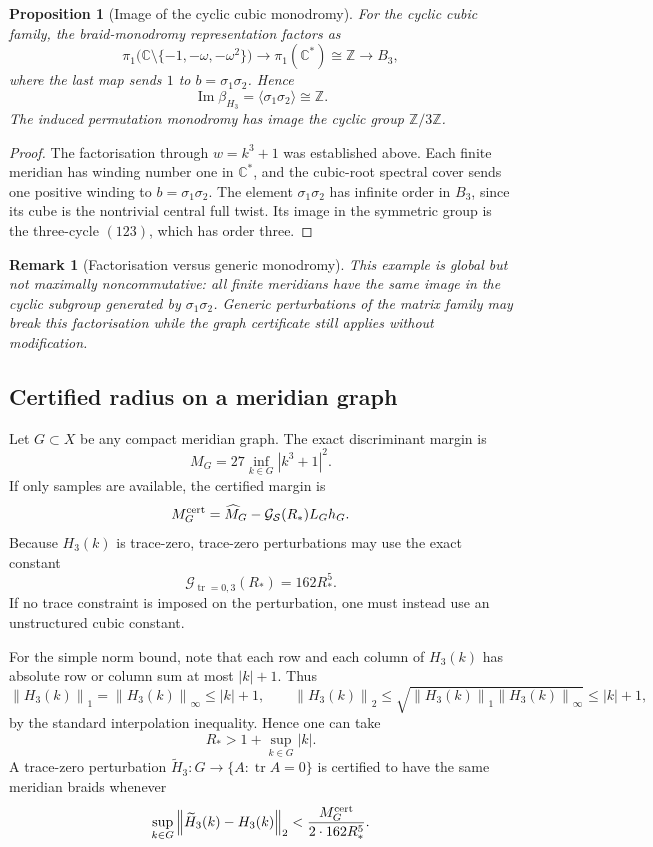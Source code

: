 \documentclass[11pt]{article}
\newtheorem{proposition}[theorem]{Proposition}
\newtheorem{remark}[theorem]{Remark}
\numberwithin{equation}{section}
\DeclareMathOperator{\tr}{tr}
\newcommand{\bbC}{\mathbb C}
\newcommand{\bbZ}{\mathbb Z}
\newcommand{\cG}{\mathcal G}
\newcommand{\cS}{\mathcal S}
\newcommand{\norm}[1]{\left\|#1\right\|}
\newcommand{\abs}[1]{\left|#1\right|}
\newcommand{\wt}[1]{\widetilde{#1}}
\begin{document}
\begin{proposition}[Image of the cyclic cubic monodromy]\label{prop:cyclic-image}
For the cyclic cubic family, the braid-monodromy representation factors as
\[
  \pi_1\bigl(\bbC\setminus\{-1,-\omega,-\omega^2\}\bigr)
  \longrightarrow \pi_1(\bbC^*)\cong\bbZ
  \longrightarrow B_3,
\]
where the last map sends \(1\) to \(b=\sigma_1\sigma_2\).  Hence
\[
  \operatorname{Im}\beta_{H_3}=\langle \sigma_1\sigma_2\rangle\cong\bbZ.
\]
The induced permutation monodromy has image the cyclic group \(\bbZ/3\bbZ\).
\end{proposition}

\begin{proof}
The factorisation through \(w=k^3+1\) was established above.  Each finite
meridian has winding number one in \(\bbC^*\), and the cubic-root spectral
cover sends one positive winding to \(b=\sigma_1\sigma_2\).  The element
\(\sigma_1\sigma_2\) has infinite order in \(B_3\), since its cube is the
nontrivial central full twist.  Its image in the symmetric group is the
three-cycle \((123)\), which has order three.
\end{proof}

\begin{remark}[Factorisation versus generic monodromy]
This example is global but not maximally noncommutative: all finite
meridians have the same image in the cyclic subgroup generated by
\(\sigma_1\sigma_2\).  Generic perturbations of the matrix family may break
this factorisation while the graph certificate still applies without
modification.
\end{remark}

\subsection{Certified radius on a meridian graph}

Let $G\subset X$ be any compact meridian graph.  The exact discriminant
margin is
\[
  M_G=27\inf_{k\in G}\abs{k^3+1}^2.
\]
If only samples are available, the certified margin is
\[
  M_G^{\rm cert}=\widehat M_G-\cG_{\cS}(R_*)L_Gh_G.
\]
Because $H_3(k)$ is trace-zero, trace-zero perturbations may use the exact
constant
\[
  \cG_{\tr=0,3}(R_*)=162R_*^5.
\]
If no trace constraint is imposed on the perturbation, one must instead use
an unstructured cubic constant.

For the simple norm bound, note that each row and each column of \(H_3(k)\)
has absolute row or column sum at most \(\abs{k}+1\).  Thus
\[
  \norm{H_3(k)}_1=\norm{H_3(k)}_\infty\le \abs{k}+1,
  \qquad
  \norm{H_3(k)}_2\le
  \sqrt{\norm{H_3(k)}_1\norm{H_3(k)}_\infty}
  \le \abs{k}+1,
\]
by the standard interpolation inequality.  Hence one can take
\[
  R_* > 1+\sup_{k\in G}\abs{k}.
\]
A trace-zero perturbation $\wt H_3:G\to\{A:\tr A=0\}$ is certified to have
the same meridian braids whenever
\[
  \sup_{k\in G}\norm{\wt H_3(k)-H_3(k)}_2
  <
  \frac{M_G^{\rm cert}}{2\cdot 162R_*^5}.
\]
\end{document}
